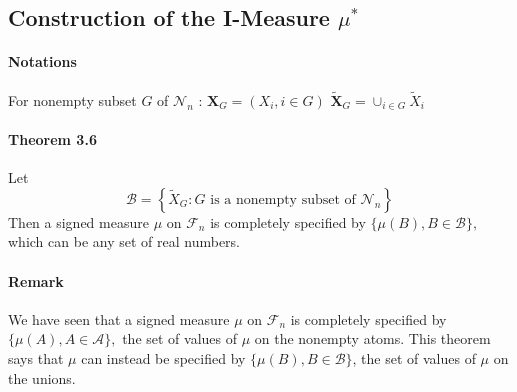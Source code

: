 \documentclass[8pt]{article}
\begin{document}
\subsection{Construction of the I-Measure $\mu^{*}$}
\begin{tcolorbox}
\paragraph{Notations} 
For nonempty subset $G$ of $\mathcal{N}_{n}$ :
$\boldsymbol{X}_{G}=\left(X_{i}, i \in G\right)$ \qquad
$\boldsymbol{\tilde { X }}_{G}=\cup_{i \in G} \tilde{X}_{i}$
\\
\paragraph{Theorem 3.6} Let
$$
\mathcal{B}=\left\{\tilde{X}_{G}: G \text { is a nonempty subset of } \mathcal{N}_{n}\right\}
$$
Then a signed measure $\mu$ on $\mathcal{F}_{n}$ is completely specified by $\{\mu(B), B \in \mathcal{B}\},$ which can be any set of real numbers.

\paragraph{Remark} We have seen that a signed measure $\mu$ on $\mathcal{F}_{n}$ is completely specified by $\{\mu(A), A \in \mathcal{A}\},$ the set of values of $\mu$ on the nonempty atoms. This theorem says that $\mu$ can instead be specified by $\{\mu(B), B \in \mathcal{B}\}$, the set of values of $\mu$ on the unions.
\end{tcolorbox}
\end{document}
